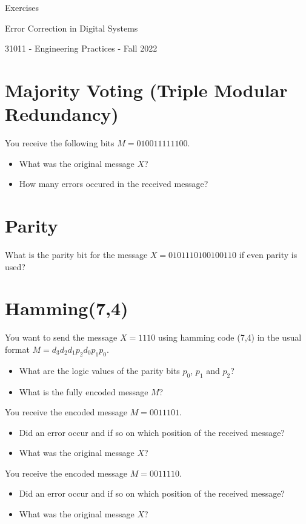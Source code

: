\documentclass[a4paper]{article}
\newif\ifsolution
\newcommand{\sol}[1]{%
\ifsolution
\textcolor{red}{#1}
\fi
}
\begin{document}
    
\begin{center}
    {\LARGE Exercises\par}
    {\Large Error Correction in Digital Systems\par}
    {\large 31011 - Engineering Practices - Fall 2022\par}
\end{center}

\section{Majority Voting (Triple Modular Redundancy)}
You receive the following bits $M=010011111100$.
\begin{itemize}
    \item What was the original message $X$? \sol{0110}
    \item How many errors occured in the received message? \sol{3}
\end{itemize} 

\section{Parity}
What is the parity bit for the message $X=0101110100100110$ if even parity is used? \sol{0}

\section{Hamming(7,4)}


You want to send the message $X=1110$ using hamming code (7,4) in the usual format $M=d_3d_2d_1p_2d_0p_1p_0$.
\begin{itemize}
    \item What are the logic values of the parity bits $p_0$, $p_1$ and $p_2$? \sol{$p=100$}
    \item What is the fully encoded message $M$? \sol{$1111000$}
\end{itemize}


\noindent You receive the encoded message $M=0011101$.
\begin{itemize}
    \item Did an error occur and if so on which position of the received message? \sol{error on position 3 (1-indexed)}
    \item What was the original message $X$? \sol{0010}
\end{itemize}

\noindent You receive the encoded message $M=0011110$.
\begin{itemize}
    \item Did an error occur and if so on which position of the received message? \sol{no error}
    \item What was the original message $X$? \sol{0011}
\end{itemize}
\end{document}
